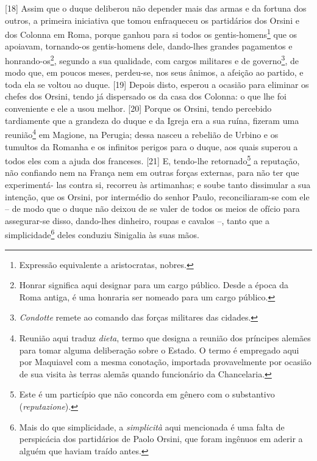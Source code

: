 {[}18{]} Assim que o duque deliberou não depender mais das armas e da
fortuna dos outros, a primeira iniciativa que tomou enfraqueceu os
partidários dos Orsini e dos Colonna em Roma, porque ganhou para si
todos os gentis-homens\footnote{Expressão equivalente a aristocratas,
  nobres.} que os apoiavam, tornando-os gentis-homens dele, dando-lhes
grandes pagamentos e honrando-os\footnote{Honrar significa aqui designar
  para um cargo público. Desde a época da Roma antiga, é uma honraria
  ser nomeado para um cargo público.}, segundo a sua qualidade, com
cargos militares e de governo\footnote{\emph{Condotte} remete ao comando
  das forças militares das cidades.}, de modo que, em poucos meses,
perdeu-se, nos seus ânimos, a afeição ao partido, e toda ela se voltou
ao duque. {[}19{]} Depois disto, esperou a ocasião para eliminar os
chefes dos Orsini, tendo já dispersado os da casa dos Colonna: o que lhe
foi conveniente e ele a usou melhor. {[}20{]} Porque os Orsini, tendo
percebido tardiamente que a grandeza do duque e da Igreja era a sua
ruína, fizeram uma reunião\footnote{Reunião aqui traduz \emph{dieta},
  termo que designa a reunião dos príncipes alemães para tomar alguma
  deliberação sobre o Estado. O termo é empregado aqui por Maquiavel com
  a mesma conotação, importada provavelmente por ocasião de sua visita
  às terras alemãs quando funcionário da Chancelaria.} em Magione, na
Perugia; dessa nasceu a rebelião de Urbino e os tumultos da Romanha e os
infinitos perigos para o duque, aos quais superou a todos eles com a
ajuda dos franceses. {[}21{]} E, tendo-lhe retornado\footnote{Este é um
  particípio que não concorda em gênero com o substantivo
  (\emph{reputazione}).} a reputação, não confiando nem na França nem em
outras forças externas, para não ter que experimentá- las contra si,
recorreu às artimanhas; e soube tanto dissimular a sua intenção, que os
Orsini, por intermédio do senhor Paulo, reconciliaram-se com ele -- de
modo que o duque não deixou de se valer de todos os meios de ofício para
assegurar-se disso, dando-lhes dinheiro, roupas e cavalos --, tanto que
a simplicidade\footnote{Mais do que simplicidade, a \emph{simplicità}
  aqui mencionada é uma falta de perspicácia dos partidários de Paolo
  Orsini, que foram ingênuos em aderir a alguém que haviam traído antes.}
deles conduziu Sinigalia às suas mãos.

